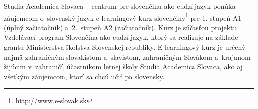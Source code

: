 Studia Academica Slovaca – centrum pre slovenčinu ako cudzí jazyk ponúka záujemcom o~slovenský jazyk e-learningový kurz slovenčiny\footnote{\url{http://www.e-slovak.sk}} pre 1. stupeň A1 (úplný začiatočník) a~2.~stupeň A2 (začiatočník). Kurz je súčasťou projektu Vzdelávací program Slovenčina ako cudzí jazyk, ktorý sa realizuje na základe grantu Ministerstva školstva Slovenskej republiky. E-learningový kurz je určený najmä zahraničným slovakistom a~slavistom, zahraničným Slovákom a~krajanom žijúcim v~zahraničí, účastníkom letnej školy Studia Academica Slovaca, ako aj všetkým záujemcom, ktorí sa chcú učiť po slovensky.
